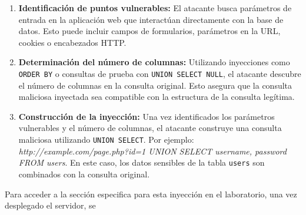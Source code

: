 \documentclass[a4paper,12pt]{article}
\begin{document}
\begin{enumerate}
    \item \textbf{Identificación de puntos vulnerables:} El atacante busca parámetros de entrada en la aplicación web que interactúan directamente con la base de datos. Esto puede incluir campos de formularios, parámetros en la URL, cookies o encabezados HTTP.
    
    \item \textbf{Determinación del número de columnas:} Utilizando inyecciones como \texttt{ORDER BY} o consultas de prueba con \texttt{UNION SELECT NULL}, el atacante descubre el número de columnas en la consulta original. Esto asegura que la consulta maliciosa inyectada sea compatible con la estructura de la consulta legítima.
    
    \item \textbf{Construcción de la inyección:} Una vez identificados los parámetros vulnerables y el número de columnas, el atacante construye una consulta maliciosa utilizando \texttt{UNION SELECT}. Por ejemplo: \textit{http://example.com/page.php?id=1 UNION SELECT username, password FROM users}. En este caso, los datos sensibles de la tabla \texttt{users} son combinados con la consulta original.
\end{enumerate}

Para acceder a la sección especifica para esta inyección en el laboratorio, una vez desplegado el servidor, se 

\end{document}
